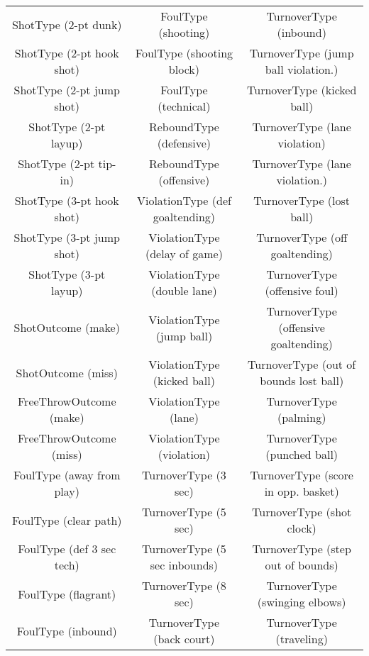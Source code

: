 \begin{table}[p]
	\ttfamily \footnotesize
	\begin{tabular}{ccc}
		ShotType (2-pt dunk)        & FoulType (shooting)                 & TurnoverType (inbound)                 \\
		ShotType (2-pt hook shot)   & FoulType (shooting block)           & TurnoverType (jump ball violation.)    \\
		ShotType (2-pt jump shot)   & FoulType (technical)                & TurnoverType (kicked ball)             \\
		ShotType (2-pt layup)       & ReboundType (defensive)             & TurnoverType (lane violation)          \\
		ShotType (2-pt tip-in)      & ReboundType (offensive)             & TurnoverType (lane violation.)         \\
		ShotType (3-pt hook shot)   & ViolationType (def goaltending)     & TurnoverType (lost ball)               \\
		ShotType (3-pt jump shot)   & ViolationType (delay of game)       & TurnoverType (off goaltending)         \\
		ShotType (3-pt layup)       & ViolationType (double lane)         & TurnoverType (offensive foul)          \\
		ShotOutcome (make)          & ViolationType (jump ball)           & TurnoverType (offensive goaltending)   \\
		ShotOutcome (miss)          & ViolationType (kicked ball)         & TurnoverType (out of bounds lost ball) \\
		FreeThrowOutcome (make)     & ViolationType (lane)                & TurnoverType (palming)                 \\
		FreeThrowOutcome (miss)     & ViolationType (violation)           & TurnoverType (punched ball)            \\
		FoulType (away from play)   & TurnoverType (3 sec)                & TurnoverType (score in opp. basket)    \\
		FoulType (clear path)       & TurnoverType (5 sec)                & TurnoverType (shot clock)              \\
		FoulType (def 3 sec tech)   & TurnoverType (5 sec inbounds)       & TurnoverType (step out of bounds)      \\
		FoulType (flagrant)         & TurnoverType (8 sec)                & TurnoverType (swinging elbows)         \\
		FoulType (inbound)          & TurnoverType (back court)           & TurnoverType (traveling)               \\

\end{tabular}
\end{table}
